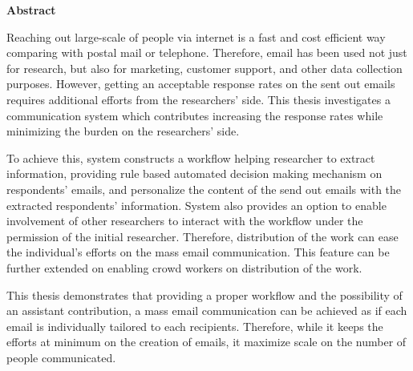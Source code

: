
\clearemptydoublepage
{}

\vspace*{2cm}
{\Large \bf Abstract}
\vspace{1cm}

Reaching out large-scale of people via internet is a fast and cost efficient way comparing with postal mail or telephone. Therefore, email has been used not just for research, but also for marketing, customer support, and other data collection purposes. However, getting an acceptable response rates on the sent out emails requires additional efforts from the researchers' side. This thesis investigates a communication system which contributes increasing the response rates while minimizing the burden on the researchers' side. 
\vspace{1cm}

To achieve this, system constructs a workflow helping researcher to extract information, providing rule based automated decision making mechanism on respondents' emails, and personalize the content of the send out emails with the extracted respondents' information. System also provides an option to enable involvement of other researchers to interact with the workflow under the permission of the initial researcher. Therefore, distribution of the work can ease the individual's efforts on the mass email communication. This feature can be further extended on enabling crowd workers on distribution of the work.
\vspace{1cm}

This thesis demonstrates that providing a proper workflow and the possibility of an assistant contribution, a mass email communication can be achieved as if each email is individually tailored to each recipients. Therefore, while it keeps the efforts at minimum on the creation of emails, it maximize scale on the number of people communicated.
